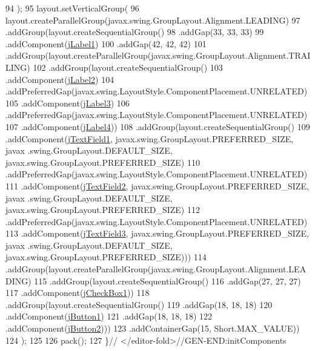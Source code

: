 \begin{DoxyCode}
94         );
95         layout.setVerticalGroup(
96             layout.createParallelGroup(javax.swing.GroupLayout.Alignment.LEADING)
97             .addGroup(layout.createSequentialGroup()
98                 .addGap(33, 33, 33)
99                 .addComponent(\mbox{\hyperlink{classsoftware_1_1_ingresar_preso_a2636febe75f015393218663a91a34e0d}{jLabel1}})
100                 .addGap(42, 42, 42)
101                 .addGroup(layout.createParallelGroup(javax.swing.GroupLayout.Alignment.TRAILING)
102                     .addGroup(layout.createSequentialGroup()
103                         .addComponent(\mbox{\hyperlink{classsoftware_1_1_ingresar_preso_abdc8c3f8f7c224e30ff7c4b6c96d5f3f}{jLabel2}})
104                         .addPreferredGap(javax.swing.LayoutStyle.ComponentPlacement.UNRELATED)
105                         .addComponent(\mbox{\hyperlink{classsoftware_1_1_ingresar_preso_a83ed6c4480193eb6924a625e224524fd}{jLabel3}})
106                         .addPreferredGap(javax.swing.LayoutStyle.ComponentPlacement.UNRELATED)
107                         .addComponent(\mbox{\hyperlink{classsoftware_1_1_ingresar_preso_a5fb6376942dfd9a5ed07eb887918bea7}{jLabel4}}))
108                     .addGroup(layout.createSequentialGroup()
109                         .addComponent(\mbox{\hyperlink{classsoftware_1_1_ingresar_preso_ad9f61bb0c1750694824c000a899845cf}{jTextField1}}, javax.swing.GroupLayout.PREFERRED\_SIZE, javax
      .swing.GroupLayout.DEFAULT\_SIZE, javax.swing.GroupLayout.PREFERRED\_SIZE)
110                         .addPreferredGap(javax.swing.LayoutStyle.ComponentPlacement.UNRELATED)
111                         .addComponent(\mbox{\hyperlink{classsoftware_1_1_ingresar_preso_a5f83b859ca7fb0ef832730e50082c083}{jTextField2}}, javax.swing.GroupLayout.PREFERRED\_SIZE, javax
      .swing.GroupLayout.DEFAULT\_SIZE, javax.swing.GroupLayout.PREFERRED\_SIZE)
112                         .addPreferredGap(javax.swing.LayoutStyle.ComponentPlacement.UNRELATED)
113                         .addComponent(\mbox{\hyperlink{classsoftware_1_1_ingresar_preso_a6e52c44f802c280a2154de10ed8679fb}{jTextField3}}, javax.swing.GroupLayout.PREFERRED\_SIZE, javax
      .swing.GroupLayout.DEFAULT\_SIZE, javax.swing.GroupLayout.PREFERRED\_SIZE)))
114                 .addGroup(layout.createParallelGroup(javax.swing.GroupLayout.Alignment.LEADING)
115                     .addGroup(layout.createSequentialGroup()
116                         .addGap(27, 27, 27)
117                         .addComponent(\mbox{\hyperlink{classsoftware_1_1_ingresar_preso_af5dd1d64cebd5001a66aa292c76e6238}{jCheckBox1}}))
118                     .addGroup(layout.createSequentialGroup()
119                         .addGap(18, 18, 18)
120                         .addComponent(\mbox{\hyperlink{classsoftware_1_1_ingresar_preso_a6c00105c7f9dbaf091e58501f2f32fb9}{jButton1}})
121                         .addGap(18, 18, 18)
122                         .addComponent(\mbox{\hyperlink{classsoftware_1_1_ingresar_preso_a33ce6c95d87a5c987b9efde232b63e10}{jButton2}})))
123                 .addContainerGap(15, Short.MAX\_VALUE))
124         );
125 
126         pack();
127     \}\textcolor{comment}{// </editor-fold>//GEN-END:initComponents}
\end{DoxyCode}
